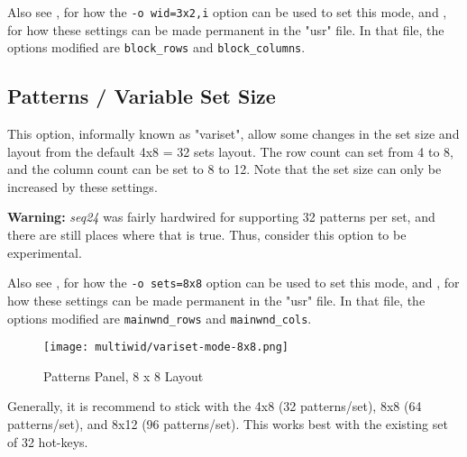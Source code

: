    Also see 
   , for how the
   \texttt{-o wid=3x2,i} option can be used to set this mode, and
   , for
   how these settings can be made permanent in the "usr" file.
   In that file, the options modified are \texttt{block\_rows} and
   \texttt{block\_columns}.

\subsection{Patterns / Variable Set Size}
\label{subsec:seq64_patterns_panel_variset}

   This option, informally known as "variset", allow some changes in
   the set size and layout from the default 4x8 = 32 sets layout.
   The row count can set from 4 to 8, and the column count can be set to 8 to
   12.  Note that the set size can only be increased by these settings.

   \textbf{Warning:}
   \textsl{seq24} was fairly hardwired for supporting 32 patterns per
   set, and there are still places where that is true.  Thus,
   consider this option to be experimental.

   Also see 
   , for how the
   \texttt{-o sets=8x8} option can be used to set this mode, and
   , for
   how these settings can be made permanent in the "usr" file.
   In that file, the options modified are \texttt{mainwnd\_rows} and
   \texttt{mainwnd\_cols}.

\begin{figure}[H]
   \centering 
   \texttt{[image: multiwid/variset-mode-8x8.png]}
   \caption{Patterns Panel, 8 x 8 Layout}
   \label{fig:pattern_window_bottom_panel_variset}
\end{figure}

   Generally, it is recommend to stick with the 4x8 (32 patterns/set),
   8x8 (64 patterns/set), and 8x12 (96 patterns/set).  This works best with the
   existing set of 32 hot-keys.

